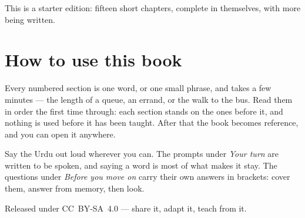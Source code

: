 \documentclass[11pt,twoside]{book}
\begin{document}
This is a starter edition: fifteen short chapters, complete in themselves, with
more being written.

\section*{How to use this book}

Every numbered section is one word, or one small phrase, and takes a few
minutes --- the length of a queue, an errand, or the walk to the bus. Read them
in order the first time through: each section stands on the ones before it, and
nothing is used before it has been taught. After that the book becomes
reference, and you can open it anywhere.

Say the Urdu out loud wherever you can. The prompts under \emph{Your turn} are
written to be spoken, and saying a word is most of what makes it stay. The
questions under \emph{Before you move on} carry their own answers in brackets:
cover them, answer from memory, then look.

Released under CC~BY-SA~4.0 --- share it, adapt it, teach from it.

\tableofcontents

\mainmatter


\end{document}
